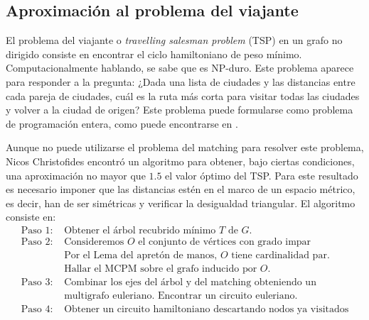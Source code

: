 \documentclass[twoside,a4paper,openright,12pt,tikz]{book}
\begin{document}
\subsection{Aproximación al problema del viajante}
El problema del viajante o \textit{travelling salesman problem} (TSP) en un grafo no dirigido consiste en encontrar el ciclo hamiltoniano de peso mínimo. Computacionalmente hablando, se sabe que es NP-duro. Este problema aparece para responder a la pregunta: ¿Dada una lista de ciudades y las distancias entre cada pareja de ciudades, cuál es la ruta más corta para visitar todas las ciudades y volver a la ciudad de origen? Este problema puede formularse como problema de programación entera, como puede encontrarse en \cite{papa}. 

Aunque no puede utilizarse el problema del matching para resolver este problema, Nicos Christofides encontró un algoritmo \cite{nico} para obtener, bajo ciertas condiciones, una aproximación no mayor que $1.5$ el valor óptimo del TSP. Para este resultado es necesario imponer que las distancias estén en el marco de un espacio métrico, es decir, han de ser simétricas y verificar la desigualdad triangular. El algoritmo consiste en:
\begin{align*}
\text{Paso 1: }&\text{Obtener el árbol recubrido mínimo $T$ de $G$.}\\
\text{Paso 2: }&\text{Consideremos $O$ el conjunto de vértices con grado impar}\\
&\text{Por el Lema del apretón de manos, $O$ tiene cardinalidad par.}\\
&\text{Hallar el MCPM sobre el grafo inducido por $O$.}\\
\text{Paso 3: }& \text{Combinar los ejes del árbol y del matching obteniendo un}\\
&\text{multigrafo euleriano. Encontrar un circuito euleriano.}\\
\text{Paso 4: }&\text{Obtener un circuito hamiltoniano descartando nodos ya visitados}
\end{align*} 
\end{document}
